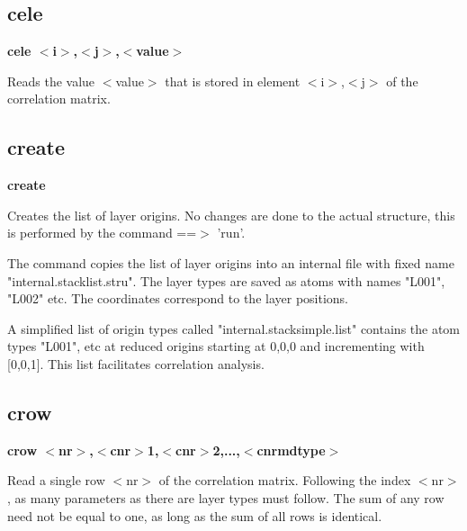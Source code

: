 \subsection*{cele}
{\bf cele $ <$i$> $,$ <$j$> $,$ <$value$> $ \par }
\par
\vspace{3pt}
Reads the value $ <$value$> $ that is stored in element $ <$i$> $,$ <$j$> $ of the 
correlation matrix. 
\subsection*{create}
{\bf create \par }
\par
\vspace{3pt}
Creates the list of layer origins. No changes are done to the 
actual structure, this is performed by the command ==$> $ 'run'. 
\par
The command copies the list of layer origins into an internal 
file with fixed name "internal.stacklist.stru". The layer types 
are saved as atoms with names "L001", "L002" etc. The coordinates 
correspond to the layer positions. 
\par
A simplified list of origin types called 
"internal.stacksimple.list" 
contains the atom types "L001", etc at reduced origins 
starting at 0,0,0 and incrementing with [0,0,1]. This 
list facilitates correlation analysis. 
\subsection*{crow}
{\bf crow $ <$nr$> $,$ <$cnr$> $1,$ <$cnr$> $2,...,$ <$cnrmdtype$> $ \par }
\par
\vspace{3pt}
Read a single row $ <$nr$> $ of the correlation matrix. Following the 
index $ <$nr$> $, as many parameters as there are layer types must follow. 
The sum of any row need not be equal to one, as long as the sum of all 
rows is identical. 
